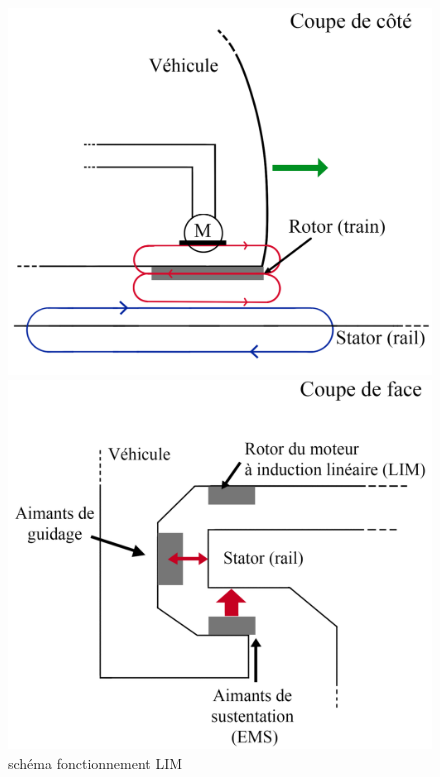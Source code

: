 \documentclass[12pt, a4paper, onecolumn]{article}
\begin{document}
\begin{figure}[H]
  \centering
  \begin{minipage}{0.45\textwidth}
    \includegraphics[width=\textwidth]
    {img/schemaLIM.png}
    \caption{schéma fonctionnement LIM}
    \label{schemaLIM}
  \end{minipage}\hfill
  \begin{minipage}{0.45\textwidth}
    \includegraphics[width=\textwidth]
    {img/schemaEMS.png}

\end{minipage}
\end{figure}
\end{document}
